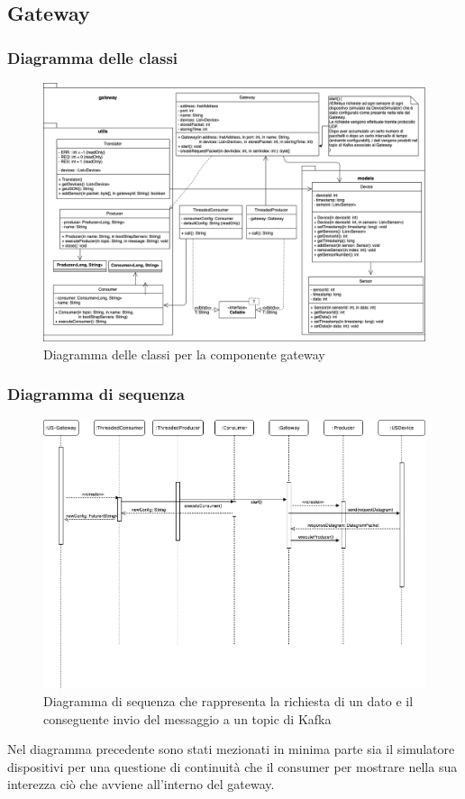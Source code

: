 \subsection{Gateway}
			\subsubsection{Diagramma delle classi}

		  	\begin{figure}[H]
				\centering
				\includegraphics[scale=0.675]{res/images/ClassiGateway.png}
				\caption{Diagramma delle classi per la componente gateway}
			\end{figure}	

			\subsubsection{Diagramma di sequenza}

		  	\begin{figure}[H]
				\centering
				\includegraphics[scale=0.675]{res/images/RichiestaInvioGateway.png}
				\caption{Diagramma di sequenza che rappresenta la richiesta di un dato e il conseguente invio del messaggio a un topic di Kafka}
			\end{figure}

			Nel diagramma precedente sono stati mezionati in minima parte sia il simulatore dispositivi per una questione di continuità che il consumer per mostrare nella sua interezza ciò che avviene all'interno del gateway.








